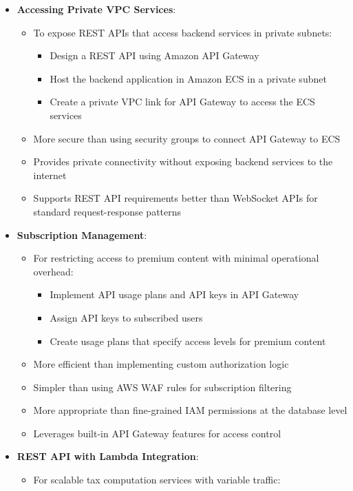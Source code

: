 \documentclass[11pt,a4paper]{report}
\begin{document}
\begin{itemize}
  \item \textbf{Accessing Private VPC Services}:
\begin{itemize}
  \item To expose REST APIs that access backend services in private subnets:
\begin{itemize}
  \item Design a REST API using Amazon API Gateway
  \item Host the backend application in Amazon ECS in a private subnet
  \item Create a private VPC link for API Gateway to access the ECS services
\end{itemize}
  \item More secure than using security groups to connect API Gateway to ECS
  \item Provides private connectivity without exposing backend services to the internet
  \item Supports REST API requirements better than WebSocket APIs for standard request-response patterns
\end{itemize}
  \item \textbf{Subscription Management}:
\begin{itemize}
  \item For restricting access to premium content with minimal operational overhead:
\begin{itemize}
  \item Implement API usage plans and API keys in API Gateway
  \item Assign API keys to subscribed users
  \item Create usage plans that specify access levels for premium content
\end{itemize}
  \item More efficient than implementing custom authorization logic
  \item Simpler than using AWS WAF rules for subscription filtering
  \item More appropriate than fine-grained IAM permissions at the database level
  \item Leverages built-in API Gateway features for access control
\end{itemize}
  \item \textbf{REST API with Lambda Integration}:
\begin{itemize}
  \item For scalable tax computation services with variable traffic:
\begin{itemize}

\end{itemize}
\end{itemize}
\end{itemize}
\end{document}
